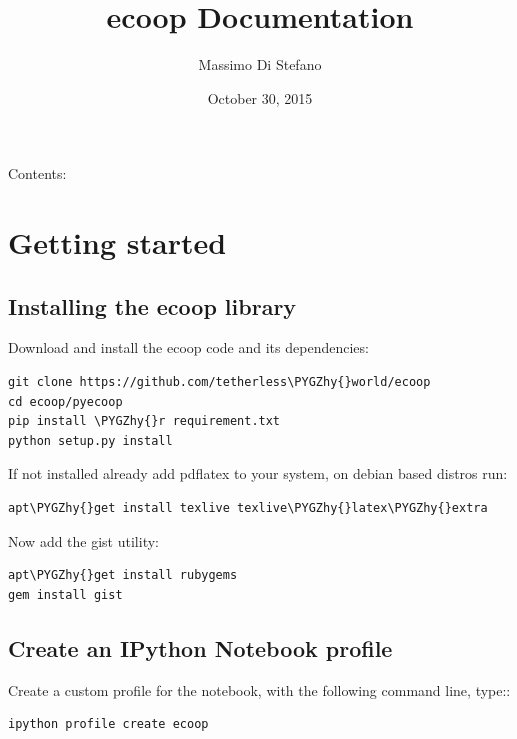 \documentclass[letterpaper,10pt,english]{sphinxmanual}
\title{ecoop Documentation}
\date{October 30, 2015}
\author{Massimo Di Stefano}
\def\PYGZhy{\char`\-}
\begin{document}
\maketitle
\tableofcontents
{}\label{index::doc}


Contents:


\chapter{Getting started}
\label{getting_started:id1}\label{getting_started:welcome-to-ecoop-s-documentation}\label{getting_started::doc}\label{getting_started:getting-started}

\section{Installing the ecoop library}
\label{getting_started:installing-the-ecoop-library}\label{getting_started:installing-ecoop}
Download and install the ecoop code and its dependencies:

\begin{Verbatim}[commandchars=\\\{\}]
git clone https://github.com/tetherless\PYGZhy{}world/ecoop
cd ecoop/pyecoop
pip install \PYGZhy{}r requirement.txt
python setup.py install
\end{Verbatim}

If not installed already add pdflatex to your system, on debian based distros run:

\begin{Verbatim}[commandchars=\\\{\}]
apt\PYGZhy{}get install texlive texlive\PYGZhy{}latex\PYGZhy{}extra
\end{Verbatim}

Now add the gist utility:

\begin{Verbatim}[commandchars=\\\{\}]
apt\PYGZhy{}get install rubygems
gem install gist
\end{Verbatim}


\section{Create an IPython Notebook profile}
\label{getting_started:id2}\label{getting_started:create-an-ipython-notebook-profile}
Create a custom profile for the notebook, with the following command line, type::

\begin{Verbatim}[commandchars=\\\{\}]
ipython profile create ecoop
\end{Verbatim}
\end{document}
